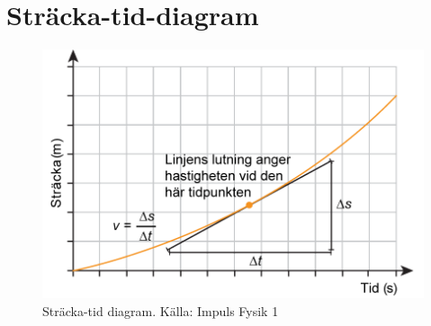 \documentclass[11pt]{article}
\begin{document}
    \section{Sträcka-tid-diagram}
    \begin{figure}[!h]
        \includegraphics[width=\textwidth]{../images/chapter3/DistTime.png}
        \caption{Sträcka-tid diagram. Källa: Impuls Fysik 1}
    \end{figure}
    \clearpage
\end{document}
